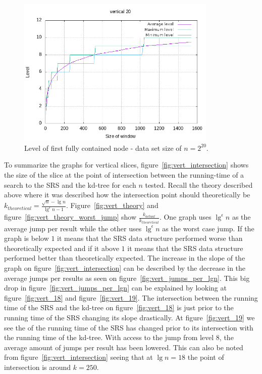 \begin{figure}[h]
    \centering
    \includegraphics[width = 0.85\textwidth]{pictures/analysis/level_vert_20.png}
    \caption{Level of first fully contained node - data set size of $n=2^{20}$.}\label{fig:level_vert_20}
\end{figure}


To summarize the graphs for vertical slices, figure~\ref{fig:vert_intersection} shows the size of the slice at the point of intersection between the running-time of a search to the SRS and the kd-tree for each $n$ tested. Recall the theory described above where it was described how the intersection point should theoretically be $k_{theoretical} = \frac{\sqrt{n} - \lg n}{\lg^\epsilon n - 1}$. Figure~\ref{fig:vert_theory} and figure~\ref{fig:vert_theory_worst_jump} show $\frac{k_{actual}}{k_{theoretical}}$. One graph uses $\lg^\epsilon n$ as the average jump per result while the other uses $\lg^\epsilon n$ as the worst case jump. If the graph is below $1$ it means that the SRS data structure performed worse than theoretically expected and if it above $1$ it means that the SRS data structure performed better than theoretically expected. The increase in the slope of the graph on figure~\ref{fig:vert_intersection} can be described by the decrease in the average jumps per results as seen on figure~\ref{fig:vert_jumps_per_lgn}. This big drop in figure~\ref{fig:vert_jumps_per_lgn} can be explained by looking at figure~\ref{fig:vert_18} and figure~\ref{fig:vert_19}. The intersection between the running time of the SRS and the kd-tree on figure~\ref{fig:vert_18} is just prior to the running time of the SRS changing its slope drastically. At figure~\ref{fig:vert_19} we see the of the running time of the SRS has changed prior to its intersection with the running time of the kd-tree. With access to the jump from level $8$, the average amount of jumps per result has been lowered. This can also be noted from figure~\ref{fig:vert_intersection} seeing that at $\lg n = 18$ the point of intersection is around $k=250$.

